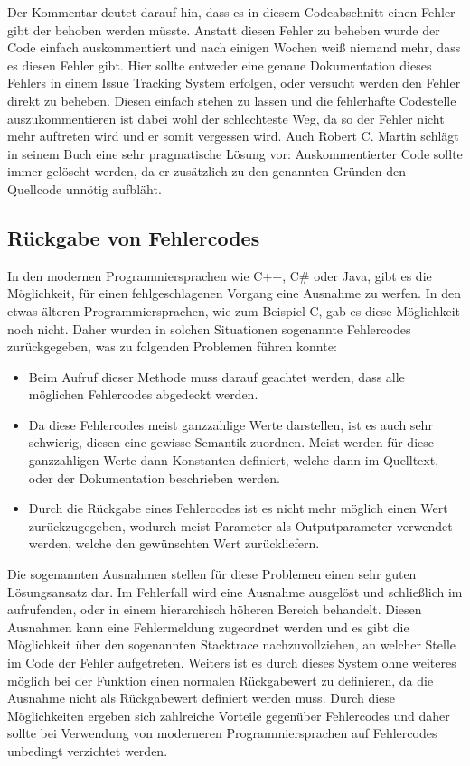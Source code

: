 \SuperPar Der Kommentar deutet darauf hin, dass es in diesem Codeabschnitt einen Fehler gibt der behoben werden müsste. Anstatt diesen Fehler zu beheben wurde der Code einfach auskommentiert und nach einigen Wochen weiß niemand mehr, dass es diesen Fehler gibt. Hier sollte entweder eine genaue Dokumentation dieses Fehlers in einem Issue Tracking System erfolgen, oder versucht werden den Fehler direkt zu beheben. Diesen einfach stehen zu lassen und die fehlerhafte Codestelle auszukommentieren ist dabei wohl der schlechteste Weg, da so der Fehler nicht mehr auftreten wird und er somit vergessen wird. Auch Robert C. Martin schlägt in seinem Buch eine sehr pragmatische Lösung vor: Auskommentierter Code sollte immer gelöscht werden, da er zusätzlich zu den genannten Gründen den Quellcode unnötig aufbläht.

\subsection{Rückgabe von Fehlercodes}
\SuperPar In den modernen Programmiersprachen wie C++, C\# oder Java, gibt es die Möglichkeit, für einen fehlgeschlagenen Vorgang eine Ausnahme zu werfen. In den etwas älteren Programmiersprachen, wie zum Beispiel C, gab es diese Möglichkeit noch nicht. Daher wurden in solchen Situationen sogenannte Fehlercodes zurückgegeben, was zu folgenden Problemen führen konnte:

\begin{itemize}
	\item Beim Aufruf dieser Methode muss darauf geachtet werden, dass alle möglichen Fehlercodes abgedeckt werden. 
	\item Da diese Fehlercodes meist ganzzahlige Werte darstellen, ist es auch sehr schwierig, diesen eine gewisse Semantik zuordnen. Meist werden für diese ganzzahligen Werte dann Konstanten definiert, welche dann im Quelltext, oder der Dokumentation beschrieben werden. 
	\item Durch die Rückgabe eines Fehlercodes ist es nicht mehr möglich einen Wert zurückzugegeben, wodurch meist Parameter als Outputparameter verwendet werden, welche den gewünschten Wert zurückliefern.
\end{itemize}

\SuperPar Die sogenannten Ausnahmen stellen für diese Problemen einen sehr guten Lösungsansatz dar. Im Fehlerfall wird eine Ausnahme ausgelöst und schließlich im aufrufenden, oder in einem hierarchisch höheren Bereich behandelt. Diesen Ausnahmen kann eine Fehlermeldung zugeordnet werden und es gibt die Möglichkeit über den sogenannten Stacktrace nachzuvollziehen, an welcher Stelle im Code der Fehler aufgetreten. Weiters ist es durch dieses System ohne weiteres möglich bei der Funktion einen normalen Rückgabewert zu definieren, da die Ausnahme nicht als Rückgabewert definiert werden muss. Durch diese Möglichkeiten ergeben sich zahlreiche Vorteile gegenüber Fehlercodes und daher sollte bei Verwendung von moderneren Programmiersprachen auf Fehlercodes unbedingt verzichtet werden.

